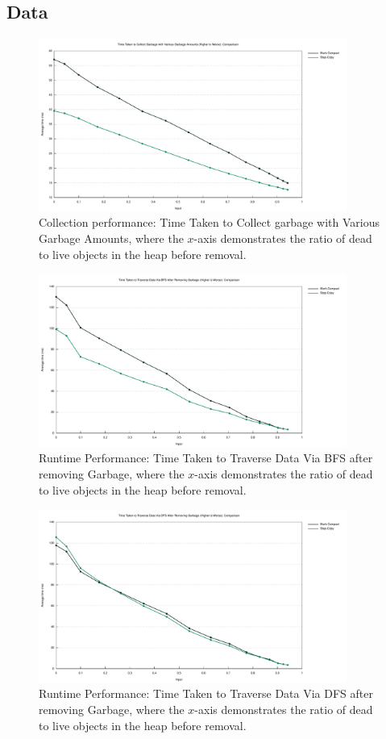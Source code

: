 \documentclass[index]{subfiles}
\begin{document}
\subsection{Data}

\begin{figure}[H]
    \centering
    \includegraphics[width=0.9\textwidth]{pics/collect.pdf}
    \caption{Collection performance: Time Taken to Collect garbage with Various Garbage Amounts, where the \(x\)-axis demonstrates the ratio of dead to live objects in the heap before removal.}
\end{figure}
\begin{figure}[H]
    \centering
    \includegraphics[width=0.9\textwidth]{pics/bfs.pdf}
    \caption{Runtime Performance: Time Taken to Traverse Data Via BFS after removing Garbage, where the \(x\)-axis demonstrates the ratio of dead to live objects in the heap before removal.}
\end{figure}
\begin{figure}[H]
    \centering
    \includegraphics[width=0.9\textwidth]{pics/dfs.pdf}
    \caption{Runtime Performance: Time Taken to Traverse Data Via DFS after removing Garbage, where the \(x\)-axis demonstrates the ratio of dead to live objects in the heap before removal.}
\end{figure}
\end{document}
